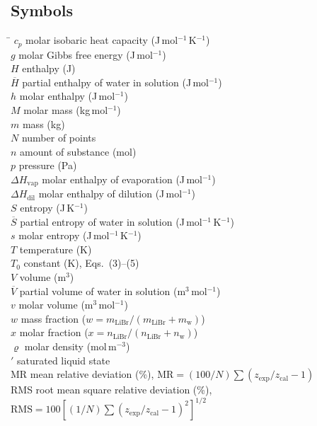 \documentclass[11pt]{article}
\newcommand{\dens}{\varrho}
\newcommand{\Hbar}{\overline{H}}
\newcommand{\Sbar}{\overline{S}}
\newcommand{\Vbar}{\overline{V}}
\newcommand{\Jmol}{J\,mol$^{-1}$}
\newcommand{\JmolK}{J\,mol$^{-1}$\,K$^{-1}$}
\newcommand{\molm}{mol\,m$^{-3}$}
\begin{document}
\subsection*{Symbols}
\begin{tabbing}
\hspace{2.0cm}\= \kill
$c_p$ \> molar isobaric heat capacity (\JmolK) \\
$g$   \> molar Gibbs free energy (\Jmol) \\
$H$   \> enthalpy (J) \\
$\Hbar$ \> partial enthalpy of water in solution (\Jmol) \\
$h$   \> molar enthalpy (\Jmol) \\
$M$   \> molar mass (kg\,mol$^{-1}$) \\
$m$   \> mass (kg) \\
$N$   \> number of points \\
$n$   \> amount of substance (mol) \\
$p$   \> pressure (Pa) \\
$\Delta H_\mathrm{vap}$ \> molar enthalpy of evaporation (\Jmol) \\
$\Delta H_\mathrm{dil}$ \> molar enthalpy of dilution (\Jmol) \\
$S$   \> entropy (J\,K$^{-1}$) \\
$\Sbar$ \> partial entropy of water in solution (\JmolK) \\
$s$   \> molar entropy (\JmolK) \\
$T$   \> temperature (K) \\
$T_0$ \> constant (K), Eqs.~(3)--(5) \\
$V$   \> volume (m$^3$) \\
$\Vbar$ \> partial volume of water in solution (m$^3$\,mol$^{-1}$) \\
$v$   \> molar volume (m$^3$\,mol$^{-1}$) \\
$w$   \> mass fraction ($w = m_\mathrm{LiBr}/(m_\mathrm{LiBr}+m_\mathrm{w})$) \\
$x$   \> molar fraction ($x = n_\mathrm{LiBr}/(n_\mathrm{LiBr}+n_\mathrm{w})$) \\
$\dens$ \> molar density (\molm) \\
$'$   \> saturated liquid state \\
MR    \> mean relative deviation (\%),
         $\mathrm{MR} = (100/N)\sum(z_\mathrm{exp}/z_\mathrm{cal}-1)$ \\
RMS   \> root mean square relative deviation (\%),
         $\mathrm{RMS} = 100\left[(1/N)\sum(z_\mathrm{exp}/z_\mathrm{cal}-1)^2\right]^{1/2}$
\end{tabbing}
\end{document}
